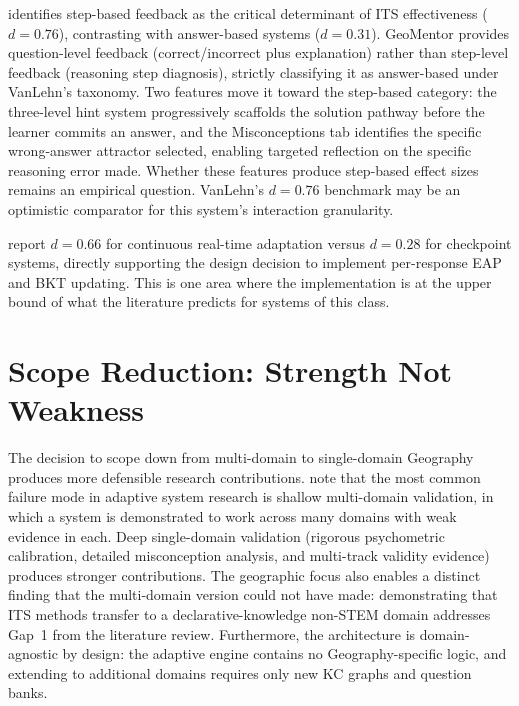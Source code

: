 \textcite{vanlehn2011} identifies step-based feedback as the critical
determinant of ITS effectiveness ($d = 0.76$), contrasting with answer-based
systems ($d = 0.31$). GeoMentor provides question-level feedback (correct/incorrect
plus explanation) rather than step-level feedback (reasoning step diagnosis),
strictly classifying it as answer-based under VanLehn's taxonomy. Two features
move it toward the step-based category: the three-level hint system
progressively scaffolds the solution pathway before the learner commits an
answer, and the Misconceptions tab identifies the specific wrong-answer
attractor selected, enabling targeted reflection on the specific reasoning
error made. Whether these features produce step-based effect sizes remains an
empirical question. VanLehn's $d = 0.76$ benchmark may be an optimistic
comparator for this system's interaction granularity.

\textcite{kulik2016} report $d = 0.66$ for continuous real-time adaptation
versus $d = 0.28$ for checkpoint systems, directly supporting the design
decision to implement per-response EAP and BKT updating. This is one area
where the implementation is at the upper bound of what the literature predicts
for systems of this class.

\section{Scope Reduction: Strength Not Weakness}
\label{sec:disc_scope}

The decision to scope down from multi-domain to single-domain Geography
produces more defensible research contributions. \textcite{desmarais2012}
note that the most common failure mode in adaptive system research is shallow
multi-domain validation, in which a system is demonstrated to work across many
domains with weak evidence in each. Deep single-domain validation (rigorous
psychometric calibration, detailed misconception analysis, and multi-track
validity evidence) produces stronger contributions. The geographic focus also
enables a distinct finding that the multi-domain version could not have made:
demonstrating that ITS methods transfer to a declarative-knowledge non-STEM
domain addresses Gap~1 from the literature review. Furthermore, the
architecture is domain-agnostic by design: the adaptive engine contains no
Geography-specific logic, and extending to additional domains requires only
new KC graphs and question banks.

